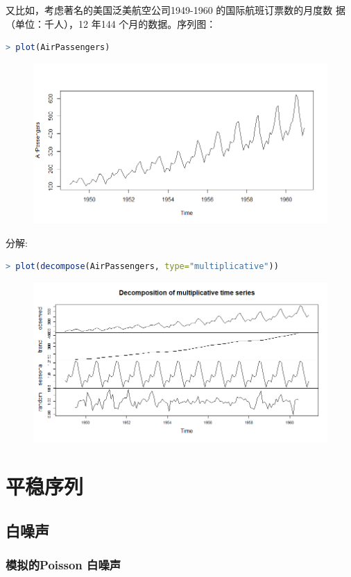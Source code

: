 \documentclass[11pt,a4paper,oneside]{book}
\begin{document}
又比如，考虑著名的美国泛美航空公司1949-1960 的国际航班订票数的月度数
据（单位：千人），12 年144 个月的数据。序列图：
\begin{lstlisting}[language=r]
> plot(AirPassengers)
\end{lstlisting}
\begin{figure}[H]
	\centering
	\includegraphics[width=\textwidth]{10.png}
\end{figure}
分解:
\begin{lstlisting}[language=r]
> plot(decompose(AirPassengers, type="multiplicative"))
\end{lstlisting}
\begin{figure}[H]
	\centering
	\includegraphics[width=\textwidth]{11.png}
\end{figure}
\section{平稳序列}
\subsection{白噪声}
\subsubsection{模拟的Poisson 白噪声}
\end{document}
